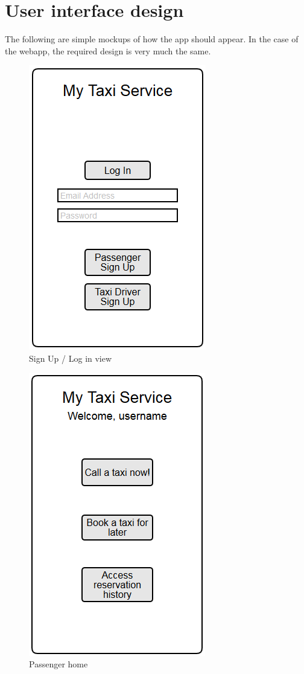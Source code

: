 \chapter{User interface design}
The following are simple mockups of how the \mts{} app should appear. In the case of the webapp, the required design is very much the same.

\begin{figure}
\centering
\includegraphics{tex-images/ui-app}
\caption{Sign Up / Log in view}
\end{figure}



\begin{figure}
\centering
\includegraphics{tex-images/ui-passenger-home}
\caption{Passenger home}
\end{figure}

